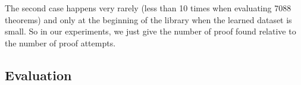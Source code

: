\documentclass[runningheads,a4paper,draft]{svjour3}
\DeclareMathOperator*{\argmax}{\arg\!\max}
\begin{document}
\begin{definition}
The second case happens very rarely (less than 10 times when evaluating 7088 
theorems) and only at the beginning of the library when the learned dataset is 
small. So in our experiments, we just give the number of proof found relative 
to the number of proof attempts.



\end{definition}





\subsection{Evaluation} 









%
%
%
%
%
%
% 

%
\end{document}
